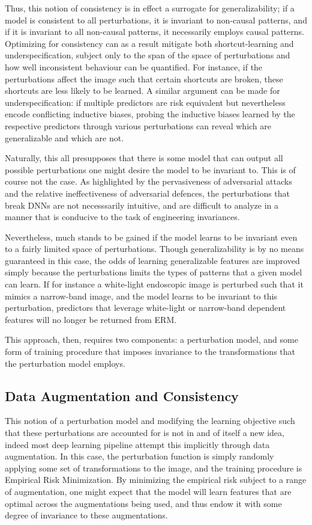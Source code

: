 Thus, this notion of consistency is in effect a surrogate for generalizability; if a model is consistent to all perturbations, it is invariant to non-causal patterns, and if it is invariant to all non-causal patterns, it necessarily employs causal patterns. Optimizing for consistency can as a result mitigate both shortcut-learning and underspecification, subject only to the span of the space of perturbations and how well inconsistent behaviour can be quantified. For instance, if the perturbations affect the image such that certain shortcuts are broken, these shortcuts are less likely to be learned. A similar argument can be made for underspecification: if multiple predictors are risk equivalent but nevertheless encode conflicting inductive biases, probing the inductive biases learned by the respective predictors through various perturbations can reveal which are generalizable and which are not.

Naturally, this all presupposes that there is some model that can output all possible perturbations one might desire the model to be invariant to. This is of course not the case. As highlighted by the pervasiveness of adversarial attacks and the relative ineffectiveness of adversarial defences, the perturbations that break DNNs are not necesssarily intuitive, and are difficult to analyze in a manner that is conducive to the task of engineering invariances.  

Nevertheless, much stands to be gained if the model learns to be invariant even to a fairly limited space of perturbations. Though generalizability is by no means guaranteed in this case, the odds of learning generalizable features are improved simply because the perturbations limits the types of patterns that a given model can learn. If for instance a white-light endoscopic image is perturbed such that it mimics a narrow-band image, and the model learns to be invariant to this perturbation, predictors that leverage white-light or narrow-band dependent features will no longer be returned from ERM.

This approach, then, requires two components: a perturbation model, and some form of training procedure that imposes invariance to the transformations that the perturbation model employs. 

\subsection{Data Augmentation and Consistency}
    This notion of a perturbation model and modifying the learning objective such that these perturbations are accounted for is not in and of itself a new idea, indeed most deep learning pipeline attempt this implicitly through data augmentation. In this case, the perturbation function is simply randomly applying some set of transformations to the image, and the training procedure is Empirical Risk Minimization. By minimizing the empirical risk subject to a range of augmentation, one might expect that the model will learn features that are optimal across the augmentations being used, and thus endow it with some degree of invariance to these augmentations.
    
